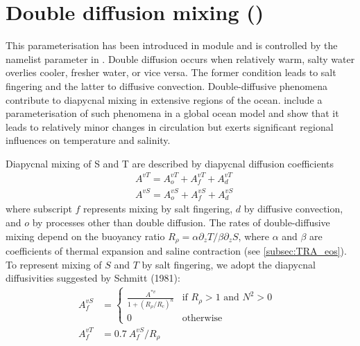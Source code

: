 \documentclass[../main/NEMO_manual]{subfiles}
\begin{document}
\section[Double diffusion mixing (\forcode{ln_zdfddm})]{Double diffusion mixing (\protect{})}
\label{subsec:ZDF_ddm}


This parameterisation has been introduced in  module and is controlled by the namelist parameter
 in .
Double diffusion occurs when relatively warm, salty water overlies cooler, fresher water, or vice versa.
The former condition leads to salt fingering and the latter to diffusive convection.
Double-diffusive phenomena contribute to diapycnal mixing in extensive regions of the ocean.
\citet{merryfield.holloway.ea_JPO99} include a parameterisation of such phenomena in a global ocean model and show that
it leads to relatively minor changes in circulation but exerts significant regional influences on
temperature and salinity.

Diapycnal mixing of S and T are described by diapycnal diffusion coefficients
\begin{align*}
  &A^{vT} = A_o^{vT}+A_f^{vT}+A_d^{vT}	\\
  &A^{vS} = A_o^{vS}+A_f^{vS}+A_d^{vS}
\end{align*}
where subscript $f$ represents mixing by salt fingering, $d$ by diffusive convection,
and $o$ by processes other than double diffusion.
The rates of double-diffusive mixing depend on the buoyancy ratio
$R_\rho = \alpha \partial_z T / \beta \partial_z S$, where $\alpha$ and $\beta$ are coefficients of
thermal expansion and saline contraction (see \autoref{subsec:TRA_eos}).
To represent mixing of $S$ and $T$ by salt fingering, we adopt the diapycnal diffusivities suggested by Schmitt
(1981):
\begin{align}
  \label{eq:ZDF_ddm_f}
  A_f^{vS} &=
             \begin{cases}
               \frac{A^{\ast v}}{1+(R_\rho / R_c)^n   } &\text{if  $R_\rho > 1$ and $N^2>0$ } \\
               0 				  					    &\text{otherwise}
             \end{cases}
  \\ 		    \label{eq:ZDF_ddm_f_T}
  A_f^{vT} &= 0.7 \ A_f^{vS} / R_\rho
\end{align}
\end{document}
